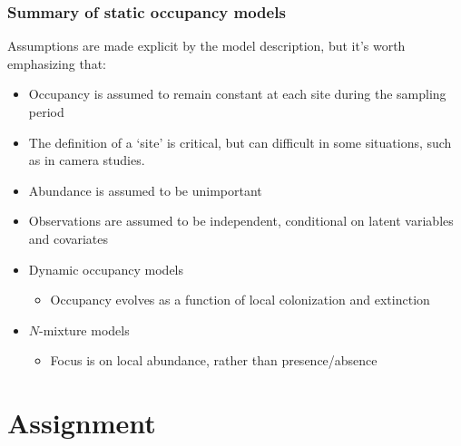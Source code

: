 \documentclass[color=usenames,dvipsnames]{beamer}\usepackage[]{graphicx}\usepackage[]{xcolor}
\begin{document}
\begin{frame}
  \frametitle{Summary of static occupancy models}
  \small
  Assumptions are made explicit by the model description, but it's worth emphasizing that: 
  \begin{itemize}[<+->]
    \item<2-> Occupancy is assumed to remain constant at each site during the sampling period
    \item<3-> The definition of a `site' is critical, but can difficult in
      some situations, such as in camera studies.
    \item<4-> Abundance is assumed to be unimportant
    \item<5-> Observations are assumed to be independent, conditional
      on latent variables and covariates
  \end{itemize}
  \vfill
  \begin{itemize}
    \item<7-> Dynamic occupancy models
    \begin{itemize}
      \item Occupancy evolves as a function of local colonization
        and extinction
    \end{itemize}
    \item<8-> $N$-mixture models
    \begin{itemize}
      \item Focus is on local abundance, rather than presence/absence
    \end{itemize}
  \end{itemize}
  \vfill
\end{frame}



\section{Assignment}
\end{document}
